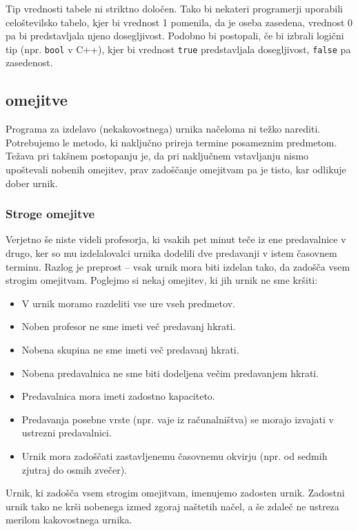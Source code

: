 \documentclass[a4paper,10pt]{article}
\begin{document}
Tip vrednosti tabele ni striktno določen. Tako bi nekateri programerji uporabili
celoštevilsko tabelo, kjer bi vrednost 1 pomenila, da je oseba zasedena, vrednost 0
pa bi predstavljala njeno dosegljivost. Podobno bi postopali, če bi izbrali logični
tip (npr. \texttt{bool} v C++), kjer bi vrednost \texttt{true} predstavljala
dosegljivost, \texttt{false} pa zasedenost.

\subsection{omejitve} %

Programa za izdelavo (nekakovostnega) urnika načeloma ni težko narediti. Potrebujemo
le metodo, ki naključno prireja termine posameznim predmetom. Težava pri takšnem postopanju
je, da pri naključnem vstavljanju nismo upoštevali nobenih omejitev, prav zadoščanje omejitvam
pa je tisto, kar odlikuje dober urnik.

\subsubsection{Stroge omejitve} %

Verjetno še niste videli profesorja, ki vsakih pet minut teče iz ene predavalnice v drugo,
ker so mu izdelalovalci urnika dodelili dve predavanji v istem časovnem terminu. Razlog
je preprost -- vsak urnik mora biti izdelan tako, da zadošča vsem strogim omejitvam.
Poglejmo si nekaj omejitev, ki jih urnik ne sme kršiti:

\begin{itemize}
   \item V urnik moramo razdeliti vse ure vseh predmetov.
   \item Noben profesor ne sme imeti več predavanj hkrati.
   \item Nobena skupina ne sme imeti več predavanj hkrati.
   \item Nobena predavalnica ne sme biti dodeljena večim predavanjem hkrati.
   \item Predavalnica mora imeti zadostno kapaciteto.
   \item Predavanja posebne vrste (npr. vaje iz računalništva) se morajo izvajati v ustrezni predavalnici.
   \item Urnik mora zadoščati zastavljenemu časovnemu okvirju (npr. od sedmih zjutraj do osmih zvečer).
\end{itemize}
Urnik, ki zadošča vsem strogim omejitvam, imenujemo zadosten urnik. Zadostni urnik tako ne
krši nobenega izmed zgoraj naštetih načel, a še zdaleč ne ustreza merilom kakovostnega urnika.
\end{document}
